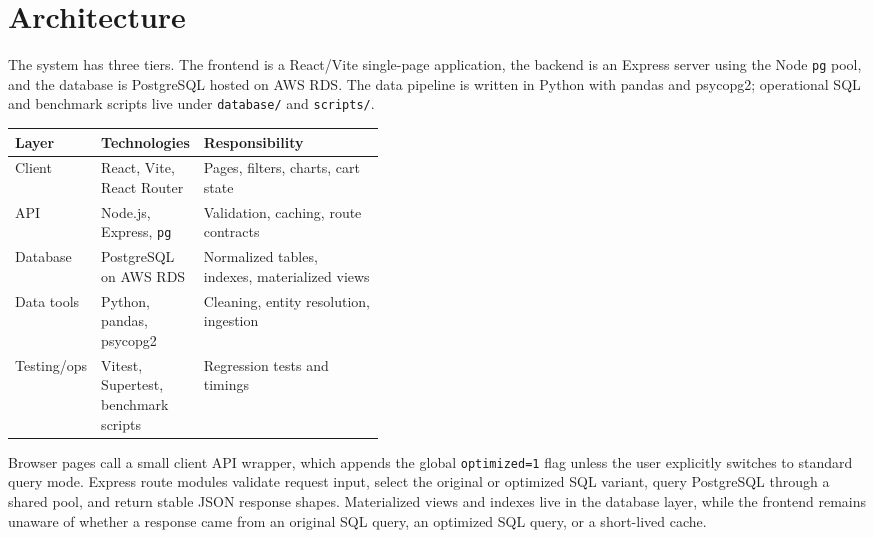 \documentclass[10pt]{article}
\begin{document}
\section{Architecture}
The system has three tiers. The frontend is a React/Vite single-page
application, the backend is an Express server using the Node \texttt{pg} pool,
and the database is PostgreSQL hosted on AWS RDS. The data pipeline is written
in Python with pandas and psycopg2; operational SQL and benchmark scripts live
under \texttt{database/} and \texttt{scripts/}.

\begin{center}
\begin{tabularx}{\linewidth}{@{}L{0.16\linewidth}L{0.27\linewidth}Y@{}}
\toprule
Layer & Technologies & Responsibility \\
\midrule
Client & React, Vite, React Router & Pages, filters, charts, cart state \\
API & Node.js, Express, \texttt{pg} & Validation, caching, route contracts \\
Database & PostgreSQL on AWS RDS & Normalized tables, indexes, materialized views \\
Data tools & Python, pandas, psycopg2 & Cleaning, entity resolution, ingestion \\
Testing/ops & Vitest, Supertest, benchmark scripts & Regression tests and timings \\
\bottomrule
\end{tabularx}
\end{center}

Browser pages call a small client API wrapper, which appends the global
\texttt{optimized=1} flag unless the user explicitly switches to standard query
mode. Express route modules validate request input, select the original or
optimized SQL variant, query PostgreSQL through a shared pool, and return stable
JSON response shapes. Materialized views and indexes live in the database layer,
while the frontend remains unaware of whether a response came from an original
SQL query, an optimized SQL query, or a short-lived cache.
\end{document}
